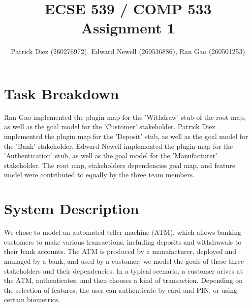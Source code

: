\documentclass[10pt,fleqn]{article}
\title{ECSE 539 / COMP 533 Assignment 1}
\author{Patrick Diez (260276972), Edward Newell (260536886), Ran Gao (260501253)}
\begin{document}
\maketitle                              %

\section{Task Breakdown}
Ran Gao implemented the plugin map for the 'Withdraw' stub of the root map,
as well as the goal model for the 'Customer' stakeholder. Patrick Diez
implemented the plugin map for the 'Deposit' stub, as well as the goal model
for the 'Bank' stakeholder. Edward Newell implemented the plugin map for the
'Authentication' stub, as well as the goal model for the 'Manufacturer'
stakeholder. The root map, stakeholders dependencies goal map, and feature
model were contributed to equally by the three team members.

\section{System Description}
We chose to model an automated teller machine (ATM), which allows banking
customers to make various transactions, including deposits and withdrawals to
their bank accounts. The ATM is produced by a manufacturer, deployed and 
managed by a bank, and used by a customer; we model the goals of these three 
stakeholders and their dependencies. In a typical scenario, a customer
arives at the ATM, authenticates, and then chooses a kind of transaction.
Depending on the selection of features, the user can authenticate by card and
PIN, or using certain biometrics.  
\end{document}
